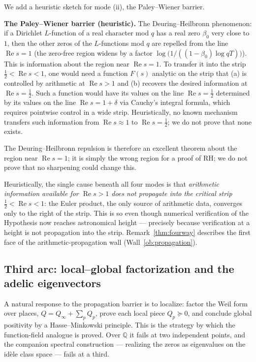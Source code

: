 \documentclass[11pt]{amsart}
\theoremstyle{definition}
\theoremstyle{remark}
\theoremstyle{definition}
\renewcommand{\Re}{\operatorname{Re}}
\begin{document}
\noindent We add a heuristic sketch for mode (ii), the Paley--Wiener barrier.

\medskip
\noindent\textbf{The Paley--Wiener barrier (heuristic).} The Deuring--Heilbronn phenomenon: if a Dirichlet $L$-function of a real character mod $q$ has a real zero $\beta_0$ very close to $1$, then the other zeros of the $L$-functions mod $q$ are repelled from the line $\Re s=1$ (the zero-free region widens by a factor $\log\bigl(1/((1-\beta_0)\log qT)\bigr)$). This is information about the region near $\Re s=1$. To transfer it into the strip $\tfrac12<\Re s<1$, one would need a function $F(s)$
analytic on the strip that (a) is controlled by arithmetic at $\Re s>1$ and (b) recovers the desired
information at $\Re s=\tfrac12$. Such a function would have its values on the line $\Re s=\tfrac12$
determined by its values on the line $\Re s=1+\delta$ via Cauchy's integral formula, which requires
pointwise control in a wide strip. Heuristically, no known mechanism transfers such information from $\Re s\approx1$ to $\Re s=\tfrac12$; we do not prove that none exists.

The Deuring--Heilbronn repulsion is therefore an excellent theorem about the region near $\Re s=1$; it is
simply the wrong region for a proof of RH; we do not prove that no sharpening could change this.

\medskip
\noindent Heuristically, the single cause beneath all four modes is that \emph{arithmetic information available for
$\Re s>1$ does not propagate into the critical strip $\tfrac12<\Re s<1$}: the Euler product, the only
source of arithmetic data, converges only to the right of the strip. This is so even though numerical
verification of the Hypothesis now reaches astronomical height \cite{PlattTrudgian} --- precisely because
verification at a height is not propagation into the strip. Remark~\ref{thm:fourway} describes the first face of the arithmetic-propagation wall (Wall~\ref{ob:propagation}).

\subsection{Third arc: local--global factorization and the adelic eigenvectors}\label{sec:arcC}

A natural response to the propagation barrier is to localize: factor the Weil form over places,
$Q=Q_\infty+\sum_pQ_p$, prove each local piece $Q_p\succeq0$, and conclude global positivity by a
Hasse--Minkowski principle. This is the strategy by which the function-field analogue is proved. Over
$\mathbb Q$ it fails at two independent points, and the companion spectral construction --- realizing the
zeros as eigenvalues on the id\`ele class space --- fails at a third.
\end{document}
